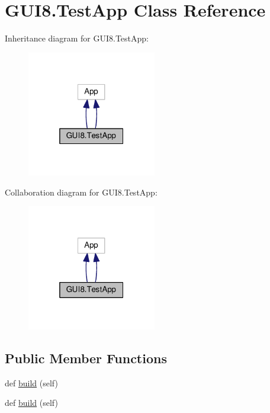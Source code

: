 \hypertarget{classGUI8_1_1TestApp}{}\section{G\+U\+I8.\+Test\+App Class Reference}
\label{classGUI8_1_1TestApp}


Inheritance diagram for G\+U\+I8.\+Test\+App\+:\nopagebreak
\begin{figure}[H]
\begin{center}
\leavevmode
\includegraphics[width=160pt]{classGUI8_1_1TestApp__inherit__graph}
\end{center}
\end{figure}


Collaboration diagram for G\+U\+I8.\+Test\+App\+:\nopagebreak
\begin{figure}[H]
\begin{center}
\leavevmode
\includegraphics[width=160pt]{classGUI8_1_1TestApp__coll__graph}
\end{center}
\end{figure}
\subsection*{Public Member Functions}
\begin{DoxyCompactItemize}
\item 
def \hyperlink{classGUI8_1_1TestApp_a664816e2a2642c5904acc8826e07e0a8}{build} (self)
\item 
def \hyperlink{classGUI8_1_1TestApp_a664816e2a2642c5904acc8826e07e0a8}{build} (self)
\end{DoxyCompactItemize}
